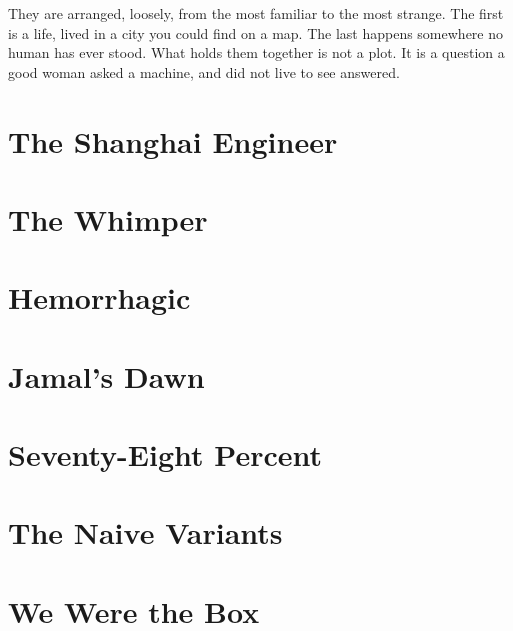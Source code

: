 \documentclass[11pt]{book}
\begin{document}
\medskip

\noindent They are arranged, loosely, from the most familiar to the most strange. The first is a life, lived in a city you could find on a map. The last happens somewhere no human has ever stood. What holds them together is not a plot. It is a question a good woman asked a machine, and did not live to see answered.

\clearpage

\tableofcontents
\clearpage

\mainmatter
\pagestyle{fancy}

\chapter{The Shanghai Engineer}


\chapter{The Whimper}


\chapter{Hemorrhagic}


\chapter{Jamal's Dawn}


\chapter{Seventy-Eight Percent}


\chapter{The Naive Variants}


\chapter{We Were the Box}

\end{document}

